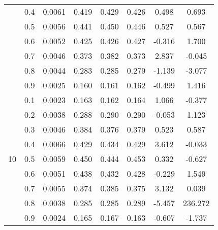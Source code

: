 \documentclass[11pt,a4paper]{report}
\begin{document}
\begin{longtable}{ | c | c || c | c | c | c | c | c | }
 & 0.4 & 0.0061 & 0.419 & 0.429 & 0.426 & 0.498 & 0.693 \\
 & 0.5 & 0.0056 & 0.441 & 0.450 & 0.446 & 0.527 & 0.567 \\
 & 0.6 & 0.0052 & 0.425 & 0.426 & 0.427 & -0.316 & 1.700 \\
 & 0.7 & 0.0046 & 0.373 & 0.382 & 0.373 & 2.837 & -0.045 \\
 & 0.8 & 0.0044 & 0.283 & 0.285 & 0.279 & -1.139 & -3.077 \\
 & 0.9 & 0.0025 & 0.160 & 0.161 & 0.162 & -0.499 & 1.416 \\
 \hline
\multirow{9}{*}{10} & 0.1 & 0.0023 & 0.163 & 0.162 & 0.164 & 1.066 & -0.377 \\
 & 0.2 & 0.0038 & 0.288 & 0.290 & 0.290 & -0.053 & 1.123 \\
 & 0.3 & 0.0046 & 0.384 & 0.376 & 0.379 & 0.523 & 0.587 \\
 & 0.4 & 0.0066 & 0.429 & 0.434 & 0.429 & 3.612 & -0.033 \\
 & 0.5 & 0.0059 & 0.450 & 0.444 & 0.453 & 0.332 & -0.627 \\
 & 0.6 & 0.0051 & 0.438 & 0.432 & 0.428 & -0.229 & 1.549 \\
 & 0.7 & 0.0055 & 0.374 & 0.385 & 0.375 & 3.132 & 0.039 \\
 & 0.8 & 0.0038 & 0.285 & 0.285 & 0.289 & -5.457 & 236.272 \\
 & 0.9 & 0.0024 & 0.165 & 0.167 & 0.163 & -0.607 & -1.737 \\
 \hline
\hline
\end{longtable}
\end{document}
